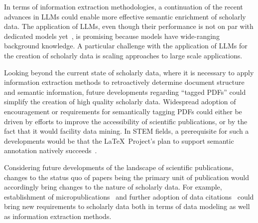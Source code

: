In terms of information extraction methodologies, a continuation of the recent advances in LLMs could enable more effective semantic enrichment of scholarly data. The application of LLMs, even though their performance is not on par with dedicated models yet~\cite{Yang2023}, is promising because models have wide-ranging background knowledge. A particular challenge with the application of LLMs for the creation of scholarly data is scaling approaches to large scale applications.

Looking beyond the current state of scholarly data, where it is necessary to apply information extraction methods to retroactively determine document structure and semantic information, future developments regarding ``tagged PDFs'' could simplify the creation of high quality scholarly data. Widespread adoption of encouragement or requirements for semantically tagging PDFs could either be driven by efforts to improve the accessibility of scientific publications, or by the fact that it would facility data mining. In STEM fields, a prerequisite for such a developments would be that the \LaTeX\ Project's plan to support semantic annotation natively succeeds~\cite{Mittelbach2020,Mittelbach2023}.

Considering future developments of the landscape of scientific publications, changes to the status quo of papers being the primary unit of publication would accordingly bring changes to the nature of scholarly data. For example, establishment of micropublications~\cite{Raciti2018} and further adoption of data citations~\cite{Kratz2015} could bring new requirements to 
scholarly data both in terms of data modeling as well as information extraction methods.
